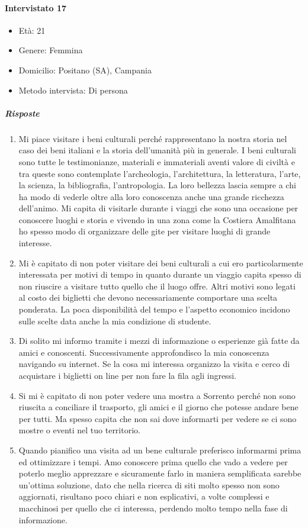\documentclass{article}
\begin{document}
\paragraph{Intervistato 17}
\begin{itemize}
\item Età: 21
\item Genere: Femmina
\item Domicilio: Positano (SA), Campania
\item Metodo intervista: Di persona
\end{itemize}
\subparagraph{Risposte}
\begin{enumerate}
\item Mi piace visitare i beni culturali perché rappresentano la nostra storia nel caso dei beni italiani e la storia dell’umanità più in generale. I beni culturali sono tutte le testimonianze, materiali e immateriali aventi valore di civiltà e tra queste sono contemplate l’archeologia, l’architettura, la letteratura, l’arte, la scienza, la bibliografia, l’antropologia. La loro bellezza lascia sempre a chi ha modo di vederle oltre alla loro conoscenza anche una grande ricchezza dell’animo. Mi capita di visitarle durante i viaggi che sono una occasione per conoscere luoghi e storia e vivendo in una zona come la Costiera Amalfitana ho spesso modo di organizzare delle gite per visitare luoghi di grande interesse.
\item Mi è capitato di non poter visitare dei beni culturali a cui ero particolarmente interessata per motivi di tempo in quanto durante un viaggio capita spesso di non riuscire a visitare tutto quello che il luogo offre. Altri motivi sono legati al costo dei biglietti che devono necessariamente comportare una scelta ponderata. La poca disponibilità del tempo e l’aspetto economico incidono sulle scelte data anche la mia condizione di studente.
\item Di solito mi informo tramite i mezzi di informazione o esperienze già fatte da amici e conoscenti. Successivamente approfondisco la mia conoscenza navigando su internet. Se la cosa mi interessa organizzo la visita e cerco di acquistare i biglietti on line per non fare la fila agli ingressi.
\item Si mi è capitato di non poter vedere una mostra a Sorrento perché non sono riuscita a conciliare il trasporto, gli amici e il giorno che potesse andare bene per tutti. Ma spesso capita che non sai dove informarti per vedere se ci sono mostre o eventi nel tuo territorio.
\item Quando pianifico una visita ad un bene culturale preferisco informarmi prima ed ottimizzare i tempi. Amo conoscere prima quello che vado a vedere per poterlo meglio apprezzare e sicuramente farlo in maniera semplificata sarebbe un’ottima soluzione, dato che nella ricerca di siti molto spesso non sono aggiornati, risultano poco chiari e non esplicativi, a volte complessi e macchinosi per quello che ci interessa, perdendo molto tempo nella fase di informazione.

\end{enumerate}
\end{document}
